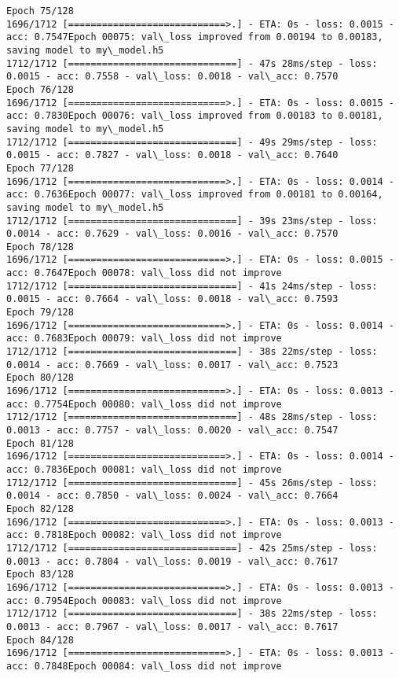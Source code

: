 \documentclass[11pt]{article}
\begin{document}
\begin{Verbatim}[commandchars=\\\{\}]
Epoch 75/128
1696/1712 [============================>.] - ETA: 0s - loss: 0.0015 - acc: 0.7547Epoch 00075: val\_loss improved from 0.00194 to 0.00183, saving model to my\_model.h5
1712/1712 [==============================] - 47s 28ms/step - loss: 0.0015 - acc: 0.7558 - val\_loss: 0.0018 - val\_acc: 0.7570
Epoch 76/128
1696/1712 [============================>.] - ETA: 0s - loss: 0.0015 - acc: 0.7830Epoch 00076: val\_loss improved from 0.00183 to 0.00181, saving model to my\_model.h5
1712/1712 [==============================] - 49s 29ms/step - loss: 0.0015 - acc: 0.7827 - val\_loss: 0.0018 - val\_acc: 0.7640
Epoch 77/128
1696/1712 [============================>.] - ETA: 0s - loss: 0.0014 - acc: 0.7636Epoch 00077: val\_loss improved from 0.00181 to 0.00164, saving model to my\_model.h5
1712/1712 [==============================] - 39s 23ms/step - loss: 0.0014 - acc: 0.7629 - val\_loss: 0.0016 - val\_acc: 0.7570
Epoch 78/128
1696/1712 [============================>.] - ETA: 0s - loss: 0.0015 - acc: 0.7647Epoch 00078: val\_loss did not improve
1712/1712 [==============================] - 41s 24ms/step - loss: 0.0015 - acc: 0.7664 - val\_loss: 0.0018 - val\_acc: 0.7593
Epoch 79/128
1696/1712 [============================>.] - ETA: 0s - loss: 0.0014 - acc: 0.7683Epoch 00079: val\_loss did not improve
1712/1712 [==============================] - 38s 22ms/step - loss: 0.0014 - acc: 0.7669 - val\_loss: 0.0017 - val\_acc: 0.7523
Epoch 80/128
1696/1712 [============================>.] - ETA: 0s - loss: 0.0013 - acc: 0.7754Epoch 00080: val\_loss did not improve
1712/1712 [==============================] - 48s 28ms/step - loss: 0.0013 - acc: 0.7757 - val\_loss: 0.0020 - val\_acc: 0.7547
Epoch 81/128
1696/1712 [============================>.] - ETA: 0s - loss: 0.0014 - acc: 0.7836Epoch 00081: val\_loss did not improve
1712/1712 [==============================] - 45s 26ms/step - loss: 0.0014 - acc: 0.7850 - val\_loss: 0.0024 - val\_acc: 0.7664
Epoch 82/128
1696/1712 [============================>.] - ETA: 0s - loss: 0.0013 - acc: 0.7818Epoch 00082: val\_loss did not improve
1712/1712 [==============================] - 42s 25ms/step - loss: 0.0013 - acc: 0.7804 - val\_loss: 0.0019 - val\_acc: 0.7617
Epoch 83/128
1696/1712 [============================>.] - ETA: 0s - loss: 0.0013 - acc: 0.7954Epoch 00083: val\_loss did not improve
1712/1712 [==============================] - 38s 22ms/step - loss: 0.0013 - acc: 0.7967 - val\_loss: 0.0017 - val\_acc: 0.7617
Epoch 84/128
1696/1712 [============================>.] - ETA: 0s - loss: 0.0013 - acc: 0.7848Epoch 00084: val\_loss did not improve

\end{Verbatim}
\end{document}
